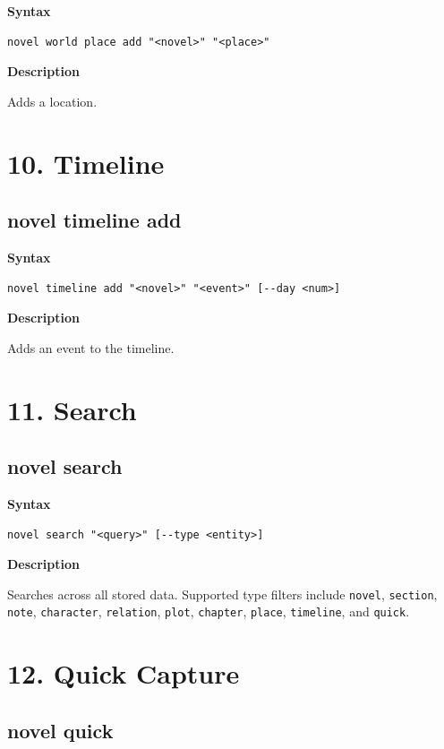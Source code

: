 \documentclass[11pt]{article}
\begin{document}
\textbf{Syntax}
\begin{verbatim}
novel world place add "<novel>" "<place>"
\end{verbatim}

\textbf{Description}

Adds a location.

\section{10. Timeline}

\subsection{novel timeline add}

\textbf{Syntax}
\begin{verbatim}
novel timeline add "<novel>" "<event>" [--day <num>]
\end{verbatim}

\textbf{Description}

Adds an event to the timeline.

\section{11. Search}

\subsection{novel search}

\textbf{Syntax}
\begin{verbatim}
novel search "<query>" [--type <entity>]
\end{verbatim}

\textbf{Description}

Searches across all stored data. Supported type filters include \texttt{novel}, \texttt{section}, \texttt{note}, \texttt{character}, \texttt{relation}, \texttt{plot}, \texttt{chapter}, \texttt{place}, \texttt{timeline}, and \texttt{quick}.

\section{12. Quick Capture}

\subsection{novel quick}
\end{document}

